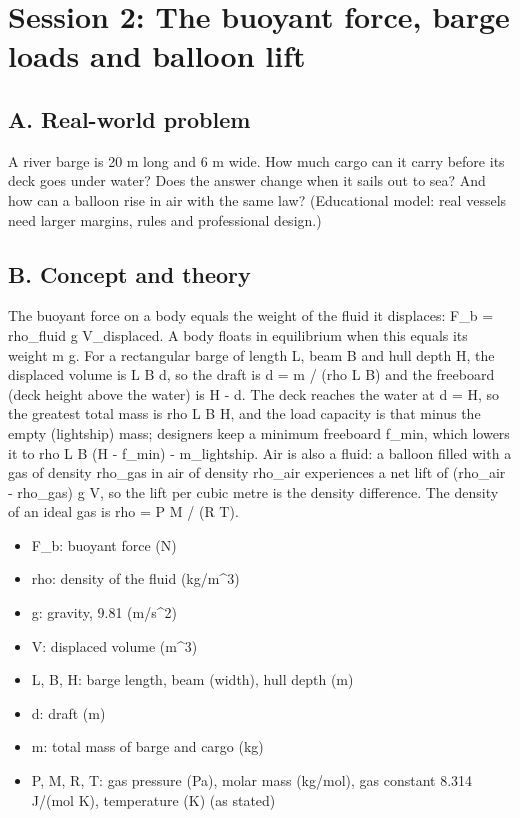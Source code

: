 \documentclass[11pt,a4paper]{article}
\begin{document}
\section{Session 2: The buoyant force, barge loads and balloon lift}

\subsection*{A. Real-world problem}
A river barge is 20 m long and 6 m wide. How much cargo can it carry before its deck goes under water? Does the answer change when it sails out to sea? And how can a balloon rise in air with the same law? (Educational model: real vessels need larger margins, rules and professional design.)

\subsection*{B. Concept and theory}
The buoyant force on a body equals the weight of the fluid it displaces: F\_b = rho\_fluid g V\_displaced. A body floats in equilibrium when this equals its weight m g. For a rectangular barge of length L, beam B and hull depth H, the displaced volume is L B d, so the draft is d = m / (rho L B) and the freeboard (deck height above the water) is H - d. The deck reaches the water at d = H, so the greatest total mass is rho L B H, and the load capacity is that minus the empty (lightship) mass; designers keep a minimum freeboard f\_min, which lowers it to rho L B (H - f\_min) - m\_lightship. Air is also a fluid: a balloon filled with a gas of density rho\_gas in air of density rho\_air experiences a net lift of (rho\_air - rho\_gas) g V, so the lift per cubic metre is the density difference. The density of an ideal gas is rho = P M / (R T).

\begin{itemize}[nosep]
\item F\_b: buoyant force (N)
\item rho: density of the fluid (kg/m\textasciicircum{}3)
\item g: gravity, 9.81 (m/s\textasciicircum{}2)
\item V: displaced volume (m\textasciicircum{}3)
\item L, B, H: barge length, beam (width), hull depth (m)
\item d: draft (m)
\item m: total mass of barge and cargo (kg)
\item P, M, R, T: gas pressure (Pa), molar mass (kg/mol), gas constant 8.314 J/(mol K), temperature (K) (as stated)
\end{itemize}
\end{document}
